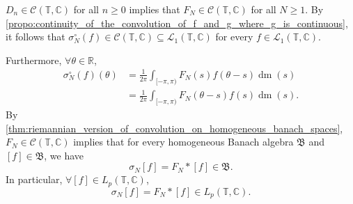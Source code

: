 \documentclass[notoc,notitlepage]{tufte-book}
\DeclareMathOperator{\dm}{dm}
\begin{document}
\begin{remark}
  $D_n \in \mathcal{C}(\mathbb{T}, \mathbb{C})$ for all $n \geq 0$
  implies that $F_N \in \mathcal{C}(\mathbb{T}, \mathbb{C})$ for all $N \geq 1$.
  By
  \cref{propo:continuity_of_the_convolution_of_f_and_g_where_g_is_continuous},
  it follows that $\sigma_N^\circ(f) \in \mathcal{C}(\mathbb{T}, \mathbb{C})
  \subseteq \mathcal{L}_1(\mathbb{T}, \mathbb{C})$
  for every $f \in \mathcal{L}_1(\mathbb{T}, \mathbb{C})$.

  Furthermore, $\forall \theta \in \mathbb{R}$,
  \begin{align*}
    \sigma_N^\circ(f)(\theta)
    &= \frac{1}{2\pi} \int_{[-\pi ,\pi)} F_N(s) f(\theta - s) \dm(s) \\
    &= \frac{1}{2\pi} \int_{[-\pi, \pi)} F_N(\theta - s) f(s) \dm(s).
  \end{align*}
  By \cref{thm:riemannian_version_of_convolution_on_homogeneous_banach_spaces},
  $F_N \in \mathcal{C}(\mathbb{T}, \mathbb{C})$ implies that for every
  homogeneous Banach algebra $\mathfrak{B}$ and $[f] \in \mathfrak{B}$,
  we have
  \begin{equation*}
    \sigma_N[f] = F_N * [f] \in \mathfrak{B}.
  \end{equation*}
  In particular, $\forall [f] \in L_p(\mathbb{T}, \mathbb{C})$,
  \begin{equation*}
    \sigma_N[f] = F_N * [f] \in L_p(\mathbb{T}, \mathbb{C}).
  \end{equation*}
\end{remark}
\end{document}
